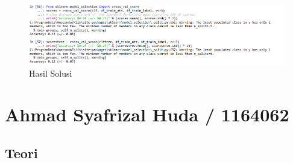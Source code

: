 \begin{figure}
      \centerline{\includegraphics[width=1\textwidth]
      {figures/cokro/c54}}
      \caption{Hasil Solusi}
      \label{c54}
      \end{figure}


\section{Ahmad Syafrizal Huda / 1164062}
\subsection{Teori}
